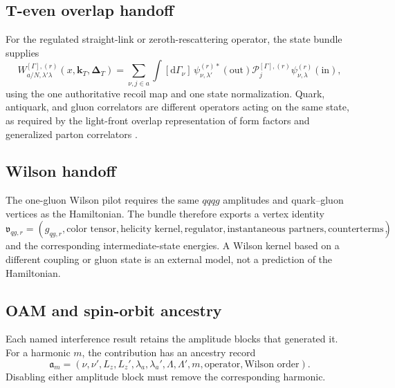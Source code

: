 \documentclass[11pt]{article}
\newcommand{\kT}{\bm{k}_{T}}
\newcommand{\DT}{\bm{\Delta}_{T}}
\newcommand{\dd}{\mathrm{d}}
\newcommand{\cP}{\mathcal P}
\newcommand{\Lz}{L_z}
\begin{document}
\subsection{T-even overlap handoff}

For the regulated straight-link or zeroth-rescattering operator, the state
bundle supplies
\begin{equation}
 W_{a/N,\lambda'\lambda}^{[\Gamma],(r)}
 (x,\kT,\DT)
 =\sum_{\nu,j\in a}
 \int[\dd\Gamma_\nu]\,
 \psi_{\nu,\lambda'}^{(r)*}(\text{out})
 \cP_{j}^{[\Gamma],(r)}
 \psi_{\nu,\lambda}^{(r)}(\text{in}),
 \label{eq:state-to-gtmd}
\end{equation}
using the one authoritative recoil map and one state normalization.  Quark,
antiquark, and gluon correlators are different operators acting on the same
state, as required by the light-front overlap representation of form factors
and generalized parton correlators \cite{BrodskyDiehlHwang2001,Meissner2009,Lorce2011}.

\subsection{Wilson handoff}

The one-gluon Wilson pilot requires the same \(qqqg\) amplitudes and quark--gluon
vertices as the Hamiltonian.  The bundle therefore exports a vertex identity
\begin{equation}
 \mathfrak v_{qg,r}
 =\left(
 g_{qg,r},\text{color tensor},\text{helicity kernel},
 \text{regulator},\text{instantaneous partners},
 \text{counterterms}
 \right),
 \label{eq:vertex-identity}
\end{equation}
and the corresponding intermediate-state energies.  A Wilson kernel based on
a different coupling or gluon state is an external model, not a prediction of
the Hamiltonian.

\subsection{OAM and spin-orbit ancestry}

Each named interference result retains the amplitude blocks that generated it.
For a harmonic \(m\), the contribution has an ancestry record
\begin{equation}
 \mathfrak a_m=
 \left(
 \nu,\nu',\Lz,\Lz',\lambda_a,\lambda_a',
 \Lambda,\Lambda',m,\text{operator},\text{Wilson order}
 \right).
 \label{eq:oam-ancestry}
\end{equation}
Disabling either amplitude block must remove the corresponding harmonic.
\end{document}
